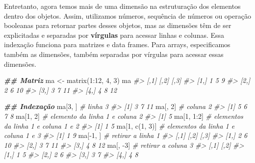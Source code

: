 \documentclass[
]{book}
\newenvironment{Shaded}{\begin{snugshade}}{\end{snugshade}}
\newcommand{\CommentTok}[1]{\textcolor[rgb]{0.37,0.37,0.37}{\textit{#1}}}
\newcommand{\DecValTok}[1]{\textcolor[rgb]{0.06,0.06,0.06}{#1}}
\newcommand{\DocumentationTok}[1]{\textcolor[rgb]{0.37,0.37,0.37}{\textbf{\textit{#1}}}}
\newcommand{\FunctionTok}[1]{\textcolor[rgb]{0,0,0}{#1}}
\newcommand{\NormalTok}[1]{#1}
\newcommand{\OtherTok}[1]{\textcolor[rgb]{0.37,0.37,0.37}{#1}}
\newcommand{\SpecialCharTok}[1]{\textcolor[rgb]{0,0,0}{#1}}
\begin{document}
Entretanto, agora temos mais de uma dimensão na estruturação dos elementos dentro dos objetos. Assim, utilizamos números, sequência de números ou operação booleanas para retornar partes desses objetos, mas as dimensões têm de ser explicitadas e separadas por \textbf{vírgulas} para acessar linhas e colunas. Essa indexação funciona para matrizes e data frames. Para arrays, especificamos também as dimensões, também separadas por vírgulas para acessar essas dimensões.

\begin{Shaded}
\begin{Highlighting}[]
\DocumentationTok{\#\# Matriz}
\NormalTok{ma }\OtherTok{\textless{}{-}} \FunctionTok{matrix}\NormalTok{(}\DecValTok{1}\SpecialCharTok{:}\DecValTok{12}\NormalTok{, }\DecValTok{4}\NormalTok{, }\DecValTok{3}\NormalTok{)}
\NormalTok{ma}
\CommentTok{\#\textgreater{}      [,1] [,2] [,3]}
\CommentTok{\#\textgreater{} [1,]    1    5    9}
\CommentTok{\#\textgreater{} [2,]    2    6   10}
\CommentTok{\#\textgreater{} [3,]    3    7   11}
\CommentTok{\#\textgreater{} [4,]    4    8   12}

\DocumentationTok{\#\# Indexação}
\NormalTok{ma[}\DecValTok{3}\NormalTok{, ] }\CommentTok{\# linha 3}
\CommentTok{\#\textgreater{} [1]  3  7 11}
\NormalTok{ma[, }\DecValTok{2}\NormalTok{] }\CommentTok{\# coluna 2}
\CommentTok{\#\textgreater{} [1] 5 6 7 8}
\NormalTok{ma[}\DecValTok{1}\NormalTok{, }\DecValTok{2}\NormalTok{] }\CommentTok{\# elemento da linha 1 e coluna 2}
\CommentTok{\#\textgreater{} [1] 5}
\NormalTok{ma[}\DecValTok{1}\NormalTok{, }\DecValTok{1}\SpecialCharTok{:}\DecValTok{2}\NormalTok{] }\CommentTok{\# elementos da linha 1 e coluna 1 e 2}
\CommentTok{\#\textgreater{} [1] 1 5}
\NormalTok{ma[}\DecValTok{1}\NormalTok{, }\FunctionTok{c}\NormalTok{(}\DecValTok{1}\NormalTok{, }\DecValTok{3}\NormalTok{)] }\CommentTok{\# elementos da linha 1 e coluna 1 e 3}
\CommentTok{\#\textgreater{} [1] 1 9}
\NormalTok{ma[}\SpecialCharTok{{-}}\DecValTok{1}\NormalTok{, ] }\CommentTok{\# retirar a linha 1}
\CommentTok{\#\textgreater{}      [,1] [,2] [,3]}
\CommentTok{\#\textgreater{} [1,]    2    6   10}
\CommentTok{\#\textgreater{} [2,]    3    7   11}
\CommentTok{\#\textgreater{} [3,]    4    8   12}
\NormalTok{ma[, }\SpecialCharTok{{-}}\DecValTok{3}\NormalTok{] }\CommentTok{\# retirar a coluna 3}
\CommentTok{\#\textgreater{}      [,1] [,2]}
\CommentTok{\#\textgreater{} [1,]    1    5}
\CommentTok{\#\textgreater{} [2,]    2    6}
\CommentTok{\#\textgreater{} [3,]    3    7}
\CommentTok{\#\textgreater{} [4,]    4    8}
\end{Highlighting}
\end{Shaded}
\end{document}
